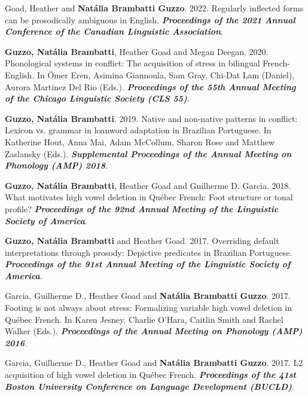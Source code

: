 \documentclass[letterpaper,10pt]{article}
\begin{document}
 Goad, Heather and \textbf{Nat\'alia Brambatti Guzzo}. 2022. Regularly inflected forms can be prosodically ambiguous in English. \textbf{\emph{Proceedings of the 2021 Annual Conference of the Canadian Linguistic Association}}.

 \textbf{Guzzo, Nat\'alia Brambatti}, Heather Goad and Megan Deegan. 2020. Phonological systems in conflict: The acquisition of stress in bilingual French-English. In \"Omer Eren, Asimina Giannoula, Sam Gray, Chi-Dat Lam (Daniel), Aurora Martinez Del Rio (Eds.). \textbf{\emph{Proceedings of the 55th Annual Meeting of the Chicago Linguistic Society (CLS 55)}}.

 \textbf{Guzzo, Nat\'alia Brambatti}. 2019. Native and non-native patterns in conflict: Lexicon vs. grammar in loanword adaptation in Brazilian Portuguese. In Katherine Hout, Anna Mai, Adam McCollum,	 Sharon Rose and Matthew Zaslansky (Eds.). \textbf{\emph{Supplemental Proceedings of the Annual Meeting on Phonology (AMP) 2018}}.

 \textbf{Guzzo, Nat\'alia Brambatti}, Heather Goad and Guilherme D. Garcia. 2018. What motivates high vowel deletion in Qu\'ebec French: Foot structure or tonal profile? \textbf{\textit{Proceedings of the 92nd Annual Meeting of the Linguistic Society of America}}.

 \textbf{Guzzo, Nat\'alia Brambatti} and Heather Goad. 2017. Overriding default interpretations through prosody: Depictive predicates in Brazilian Portuguese. \textbf{\textit{Proceedings of the 91st Annual Meeting of the Linguistic Society of America}}.

 Garcia, Guilherme D., Heather Goad and \textbf{Nat\'alia Brambatti Guzzo}. 2017. Footing is not always about stress: Formalizing variable high vowel deletion in Qu\'ebec French. In Karen Jesney, Charlie O'Hara, Caitlin Smith and Rachel Walker (Eds.). \textbf{\textit{Proceedings of the Annual Meeting on Phonology (AMP) 2016}}.

 Garcia, Guilherme D., Heather Goad and \textbf{Nat\'alia Brambatti Guzzo}. 2017. L2 acquisition of high vowel deletion in Qu\'ebec French. \textbf{\textit{Proceedings of the 41st Boston University Conference on Language Development (BUCLD)}}.
 
\end{document}
